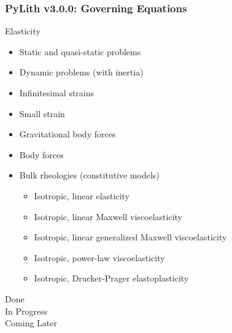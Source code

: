 \documentclass[aspectratio=169]{beamer}
\begin{document}
\newcommand{\statuslater}[1]{{\color{purple}#1}}
\newcommand{\statusdone}[1]{{\color{green}#1}}
\newcommand{\statusbuggy}[1]{{\color{red}#1}}
\newcommand{\statusinprogress}[1]{{\color{orange}#1}}
\begin{frame}
  \frametitle{PyLith v3.0.0: Governing Equations}
  \summary{}

  Elasticity
  \begin{itemize}
  \item \statusdone{Static and quasi-static problems}
  \item \statusinprogress{Dynamic problems (with inertia)}
  \item \statusdone{Infinitesimal strains}
  \item \statusinprogress{Small strain}
  \item \statusdone{Gravitational body forces}
  \item \statusdone{Body forces}
  \item Bulk rheologies (constitutive models)
    \begin{itemize}
    \item \statusdone{Isotropic, linear elasticity}
    \item \statusdone{Isotropic, linear Maxwell viscoelasticity}
    \item \statusdone{Isotropic, linear generalized Maxwell viscoelasticity}
    \item \statusdone{Isotropic, power-law viscoelasticity}
    \item \statuslater{Isotropic, Drucker-Prager elastoplasticity}
    \end{itemize}
  \end{itemize}
  \hfill%
  \begin{minipage}{0.25\textwidth}
    \statusdone{Done}\\
    \statusinprogress{In Progress}\\
    \statuslater{Coming Later}
  \end{minipage}  
\end{frame}
\end{document}
